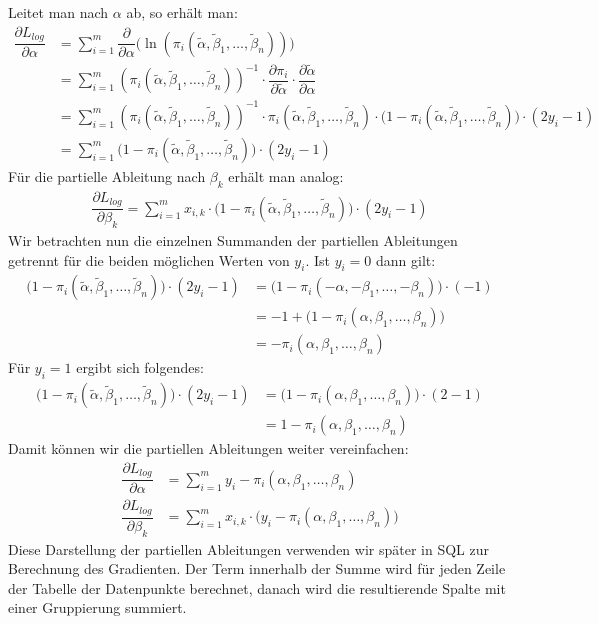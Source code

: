 Leitet man nach $\alpha$ ab, so erhält man:
\begin{align*}
    \dfrac{\partial L_{log}}{\partial \alpha} &= \sum_{i=1}^m \dfrac{\partial}{\partial \alpha} \bigg( \ln \left( \pi_i(\tilde\alpha, \tilde\beta_1, \dots, \tilde\beta_n) \right) \bigg) \\
    &= \sum_{i=1}^m \left( \pi_i(\tilde\alpha, \tilde\beta_1, \dots, \tilde\beta_n) \right)^{-1} \cdot \dfrac{\partial \pi_i}{\partial \tilde\alpha} \cdot \dfrac{\partial \tilde\alpha}{\partial \alpha} \\
    &= \sum_{i=1}^m \left( \pi_i(\tilde\alpha, \tilde\beta_1, \dots, \tilde\beta_n) \right)^{-1} \cdot \pi_i(\tilde\alpha, \tilde\beta_1, \dots, \tilde\beta_n) \cdot \big(1 - \pi_i(\tilde\alpha, \tilde\beta_1, \dots, \tilde\beta_n) \big) \cdot (2 y_i - 1) \\
    &= \sum_{i=1}^m \big(1 - \pi_i(\tilde\alpha, \tilde\beta_1, \dots, \tilde\beta_n) \big) \cdot (2 y_i - 1)
\end{align*}
Für die partielle Ableitung nach $\beta_k$ erhält man analog:
\begin{align*}
    \dfrac{\partial L_{log}}{\partial \beta_k} = \sum_{i=1}^m x_{i, k} \cdot \big(1 - \pi_i(\tilde\alpha, \tilde\beta_1, \dots, \tilde\beta_n) \big) \cdot (2 y_i - 1)
\end{align*}
Wir betrachten nun die einzelnen Summanden der partiellen Ableitungen getrennt für die beiden möglichen Werten von $y_i$. Ist $y_i = 0$ dann gilt:
\begin{align*}
    \big(1 - \pi_i(\tilde\alpha, \tilde\beta_1, \dots, \tilde\beta_n) \big) \cdot (2 y_i - 1) &= \big(1 - \pi_i(- \alpha, - \beta_1, \dots, - \beta_n) \big) \cdot (- 1) \\
    &= - 1 + \big(1 - \pi_i(\alpha, \beta_1, \dots, \beta_n) \big) \\
    &= - \pi_i(\alpha, \beta_1, \dots, \beta_n)
\end{align*}
Für $y_i = 1$ ergibt sich folgendes:
\begin{align*}
    \big(1 - \pi_i(\tilde\alpha, \tilde\beta_1, \dots, \tilde\beta_n) \big) \cdot (2 y_i - 1) &= \big(1 - \pi_i(\alpha, \beta_1, \dots, \beta_n) \big) \cdot (2 - 1) \\
    &= 1 - \pi_i(\alpha, \beta_1, \dots, \beta_n)
\end{align*}
Damit können wir die partiellen Ableitungen weiter vereinfachen:
\begin{align*}
    \dfrac{\partial L_{log}}{\partial \alpha} &= \sum_{i=1}^m y_i - \pi_i(\alpha, \beta_1, \dots, \beta_n) \\
    \dfrac{\partial L_{log}}{\partial \beta_k} &= \sum_{i=1}^m x_{i, k} \cdot \big(y_i - \pi_i(\alpha, \beta_1, \dots, \beta_n) \big)
\end{align*}
Diese Darstellung der partiellen Ableitungen verwenden wir später in SQL zur Berechnung des Gradienten. Der Term innerhalb der Summe wird für jeden Zeile der Tabelle der Datenpunkte berechnet, danach wird die resultierende Spalte mit einer Gruppierung summiert.
